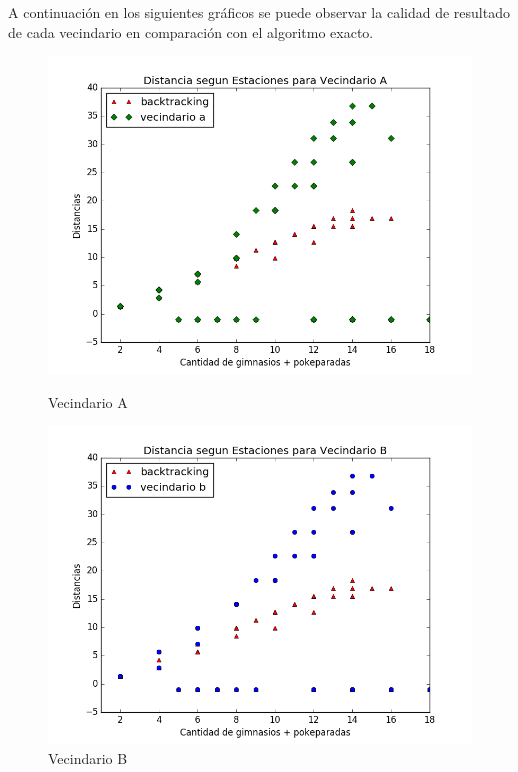 			 \par A continuación en los siguientes gráficos se puede observar la calidad de resultado de cada vecindario en comparación con el algoritmo exacto.

\blindtext

\begin{figure}[H]
  \includegraphics[width=\linewidth]{imagenes/Ej3/Exp2Ej3A.png}
  \caption{Vecindario A}
\endminipage\hfill
{}%
  \includegraphics[width=\linewidth]{imagenes/Ej3/Exp2Ej3B.png}
  \caption{Vecindario B}
\endminipage
\end{figure}

\blindtext


